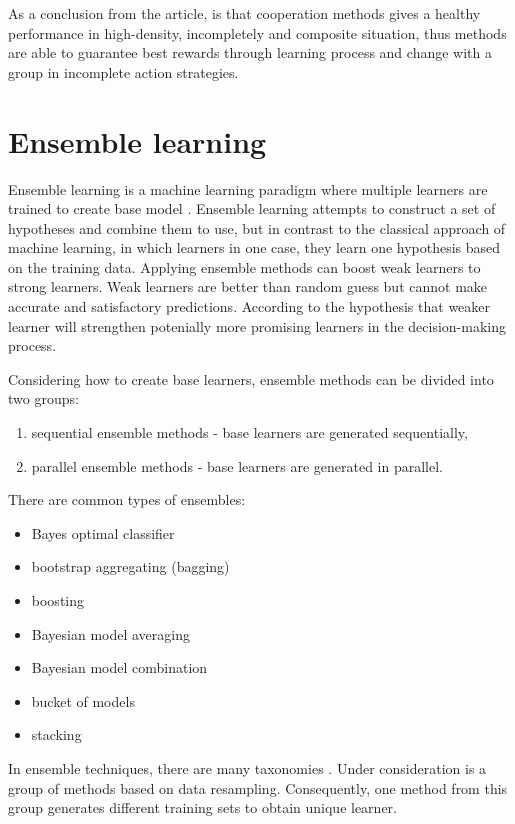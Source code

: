 As a conclusion from the article, is that cooperation methods gives a healthy performance in high-density, incompletely and composite situation, thus methods are able to guarantee best rewards through learning process and change with a group in incomplete action strategies.

\newpage
\section{Ensemble learning}
Ensemble learning is a machine learning paradigm where multiple learners are trained to create base model \cite{Zhou2009}. Ensemble learning attempts to construct a set of hypotheses and combine them to use, but in contrast to the classical approach of machine learning, in which learners in one case, they learn one hypothesis based on the training data. 
Applying ensemble methods can boost weak learners to strong learners. Weak learners are better than random guess but cannot make accurate and satisfactory predictions. According to the hypothesis that weaker learner will strengthen potenially more promising learners in the decision-making process.

Considering how to create base learners, ensemble methods can be divided into two groups:
\begin{enumerate} 
	\item sequential ensemble methods - base learners are generated sequentially,
	\item parallel ensemble methods - base learners are generated in parallel.
\end{enumerate}
There are common types of ensembles:
\begin{itemize}
	\item Bayes optimal classifier
	\item bootstrap aggregating (bagging)
	\item boosting
	\item Bayesian model averaging
	\item Bayesian model combination
	\item bucket of models
	\item stacking
\end{itemize}

In ensemble techniques, there are many taxonomies \cite{ComparisonBagging}. Under consideration is a group of methods based on data resampling. Consequently, one method from this group generates different training sets to obtain unique learner.

